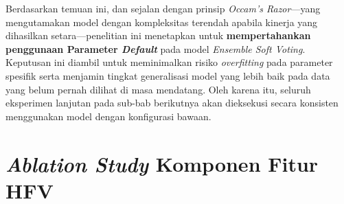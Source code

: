 Berdasarkan temuan ini, dan sejalan dengan prinsip \textit{Occam's Razor}—yang mengutamakan model dengan kompleksitas terendah apabila kinerja yang dihasilkan setara—penelitian ini menetapkan untuk \textbf{mempertahankan penggunaan Parameter \textit{Default}} pada model \textit{Ensemble Soft Voting}. Keputusan ini diambil untuk meminimalkan risiko \textit{overfitting} pada parameter spesifik serta menjamin tingkat generalisasi model yang lebih baik pada data yang belum pernah dilihat di masa mendatang. Oleh karena itu, seluruh eksperimen lanjutan pada sub-bab berikutnya akan dieksekusi secara konsisten menggunakan model dengan konfigurasi bawaan.

\section{\textit{Ablation Study} Komponen Fitur HFV}
\label{sec:ablation_study}

\begin{table}[htbp]
    \centering
    \caption{Hasil \textit{ablation study}: kinerja model berdasarkan kombinasi komponen fitur (dalam persen)}
    \label{tab:ablation_study}
\end{table}

